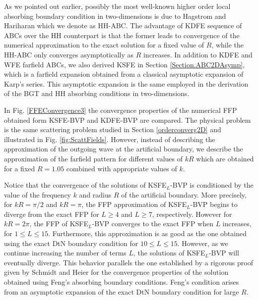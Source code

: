 \documentclass[final,3p,times,12pt]{elsarticle}
\begin{document}
As we pointed out earlier, possibly the most well-known higher order local absorbing boundary condition in two-dimensions is due to Hagstrom and Hariharan \cite{Hagstrom98} which we denote as HH-ABC. The advantage of KDFE sequence of ABCs over the HH counterpart is that the former leads to convergence of the numerical approximation to the exact solution for a fixed value of $R$, while the HH-ABC only converges asymptotically as $R$ increases. In addition to KDFE and WFE farfield ABCs, we also derived KSFE in Section \ref{Section.ABC2DAsymp}, which is a farfield expansion  obtained from a classical asymptotic expansion of Karp's series. This asymptotic expansion is the same 
employed in the derivation of the BGT and HH absorbing conditions in two-dimensions. 

In Fig. \ref{FFEConvergence3} the convergence properties of the numerical FFP obtained form KSFE-BVP and KDFE-BVP are compared. The physical problem is the same scattering problem studied in Section \ref{orderconverg2D} and illustrated in Fig. 
\ref{fig:ScattFields}. However, instead of describing the approximation of the outgoing wave at the artificial boundary, we describe the approximation of the farfield pattern for different values of $kR$ which are obtained for a fixed $R=1.05$ combined with appropriate values of $k$. 

Notice that the convergence of the solutions of KSFE$_L$-BVP is conditioned by the value of the frequency $k$ and radius $R$ of the artificial boundary. More precisely,
for $kR=\pi/2$ and $kR=\pi$, the FFP approximation of KSFE$_L$-BVP begins to diverge from the exact FFP for $L\ge 4$ and $L\ge 7$, respectively. However for $kR=2\pi$, the FFP of KSFE$_L$-BVP converges to the exact FFP when $L$ increases, for $1\le L\le 15$. Furthermore, this approximation is as good as the one obtained using the exact DtN
boundary condition for $10\le L\le 15$.
However, as we continue increasing the number of terms $L$, the solutions of KSFE$_L$-BVP will eventually diverge. This behavior parallels the one established by a rigorous proof given by Schmidt and Heier \cite{Kersten} for the convergence properties of the solution obtained using Feng's absorbing boundary conditions. Feng's condition arises from an asymptotic expansion of the exact DtN boundary condition for large $R$. 
\end{document}

